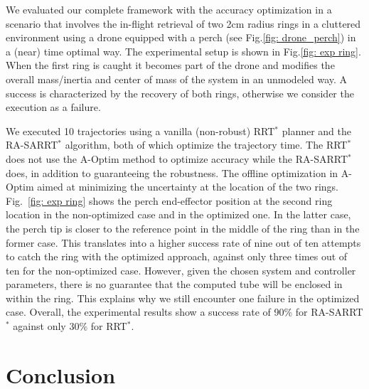 We evaluated our complete framework with the accuracy optimization in a scenario that involves the in-flight retrieval of two 2cm radius rings in a cluttered environment using a drone equipped with a perch (see Fig.\ref{fig: drone_perch}) in a (near) time optimal way.
The experimental setup is shown in Fig.\ref{fig: exp ring}.
When the first ring is caught it becomes part of the drone and modifies the overall mass/inertia and center of mass of the system in an unmodeled way. 
A success is characterized by the recovery of both rings, otherwise we consider the execution as a failure.

We executed 10 trajectories using a vanilla (non-robust) RRT$^*$ planner and the RA-SARRT$^*$ algorithm, both of which optimize the trajectory time.
The RRT$^*$ does not use the A-Optim method to optimize accuracy while the RA-SARRT$^*$ does, in addition to guaranteeing the robustness.
The offline optimization in A-Optim aimed at minimizing the uncertainty at the location of the two rings.
Fig.~\ref{fig: exp ring} shows the perch end-effector position at the second ring location in the non-optimized case and in the optimized one. 
In the latter case, the perch tip is closer to the reference point in the middle of the ring than in the former case. This translates into a higher success rate of nine out of ten attempts to catch the ring with the optimized approach, against only three times out of ten for the non-optimized case.
However, given the chosen system and controller parameters, there is no guarantee that the computed tube will be enclosed in within the ring.
This explains why we still encounter one failure in the optimized case.
Overall, the experimental results show a success rate of 90\% for RA-SARRT$^*$ against only 30\% for RRT$^*$.

\section{Conclusion} \label{sec:Conclusion}

